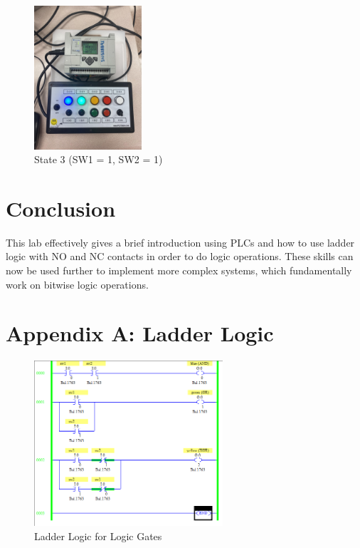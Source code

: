 \documentclass{IEEEtran}
\begin{document}
\begin{figure}[!ht] 
    \centering
    \includegraphics[width = 4cm]{state3.jpg}
    \caption{State 3 (SW1 = 1, SW2 = 1)}
    \label{fig:state3}
\end{figure}

\section{Conclusion}

This lab effectively gives a brief introduction using PLCs and how to use ladder logic with NO and NC contacts in order to do logic operations. These skills can now be used further to implement more complex systems, which fundamentally work on bitwise logic operations.

\section*{Appendix A: Ladder Logic}

\begin{figure}[!ht] 
    \centering
    \includegraphics[width = 7cm]{ladderlogic.png}
    \caption{Ladder Logic for Logic Gates}
    \label{fig:ladderlogic}
\end{figure}
\end{document}
